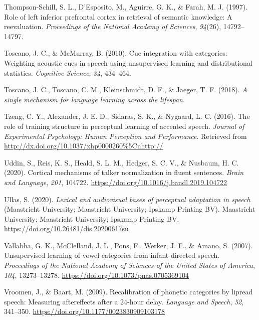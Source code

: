 \documentclass[
  11pt,
  english,
  man,floatsintext]{apa6}
\newlength{\cslhangindent}
\newlength{\cslentryspacingunit} %
\newenvironment{CSLReferences}[2] %
 {%
  \setlength{\parindent}{0pt}
  \ifodd #1
  \let\oldpar\par
  \def\par{\hangindent=\cslhangindent\oldpar}
  \fi
  \setlength{\parskip}{#2\cslentryspacingunit}
 }%
 {}
\begin{document}
\begin{CSLReferences}{1}{0}
\leavevmode{}%
Thompson-Schill, S. L., D'Esposito, M., Aguirre, G. K., \& Farah, M. J. (1997). Role of left inferior prefrontal cortex in retrieval of semantic knowledge: A reevaluation. \emph{Proceedings of the National Academy of Sciences}, \emph{94}(26), 14792--14797.

\leavevmode{}%
Toscano, J. C., \& McMurray, B. (2010). Cue integration with categories: Weighting acoustic cues in speech using unsupervised learning and distributional statistics. \emph{Cognitive Science}, \emph{34}, 434--464.

\leavevmode{}%
Toscano, J. C., Toscano, C. M., Kleinschmidt, D. F., \& Jaeger, T. F. (2018). \emph{A single mechanism for language learning across the lifespan}.

\leavevmode{}%
Tzeng, C. Y., Alexander, J. E. D., Sidaras, S. K., \& Nygaard, L. C. (2016). The role of training structure in perceptual learning of accented speech. \emph{Journal of Experimental Psychology: Human Perception and Performance}. Retrieved from \url{http://dx.doi.org/10.1037/xhp0000260\%5Cnhttp://}

\leavevmode{}%
Uddin, S., Reis, K. S., Heald, S. L. M., Hedger, S. C. V., \& Nusbaum, H. C. (2020). Cortical mechanisms of talker normalization in fluent sentences. \emph{Brain and Language}, \emph{201}, 104722. \url{https://doi.org/10.1016/j.bandl.2019.104722}

\leavevmode{}%
Ullas, S. (2020). \emph{Lexical and audiovisual bases of perceptual adaptation in speech} (Maastricht University; Maastricht University; Ipskamp Printing BV). Maastricht University; Maastricht University; Ipskamp Printing BV. \url{https://doi.org/10.26481/dis.20200617su}

\leavevmode{}%
Vallabha, G. K., McClelland, J. L., Pons, F., Werker, J. F., \& Amano, S. (2007). Unsupervised learning of vowel categories from infant-directed speech. \emph{Proceedings of the National Academy of Sciences of the United States of America}, \emph{104}, 13273--13278. \url{https://doi.org/10.1073/pnas.0705369104}

\leavevmode{}%
Vroomen, J., \& Baart, M. (2009). Recalibration of phonetic categories by lipread speech: Measuring aftereffects after a 24-hour delay. \emph{Language and Speech}, \emph{52}, 341--350. \url{https://doi.org/10.1177/0023830909103178}


\end{CSLReferences}
\end{document}
